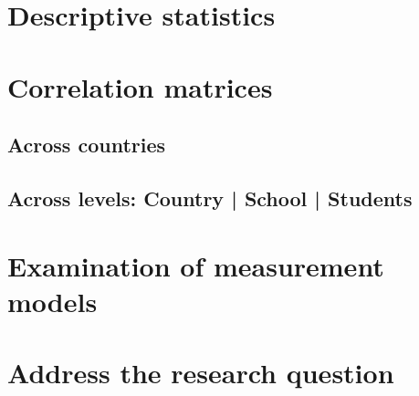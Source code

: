 \documentclass[a4paper,11pt,UKenglish,twoside,openright]{report}\usepackage[]{graphicx}\usepackage[]{color}
\begin{document}
\section{Descriptive statistics}

\section{Correlation matrices}

\subsection{Across countries}

\subsection{Across levels: Country | School | Students}

\section{Examination of measurement models}

\section{Address the research question}





\newpage
\begin{singlespace}
    \printbibliography[title=References]
\end{singlespace}





\begin{appendices}
%    
%    
%    
%    
%    
%    
\end{appendices}

\cleardoublepage
{}
{}
\printindex[a]

\cleardoublepage
{}
{}
\printindex
\end{document}
